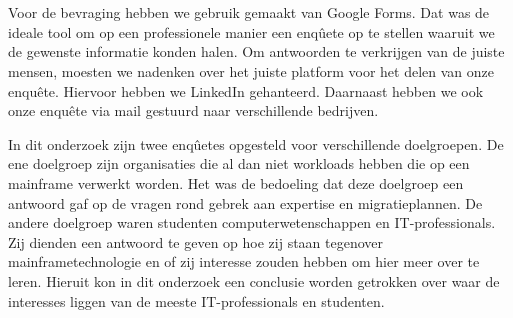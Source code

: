 \section{}
\label{sec:De bevraging}

Voor de bevraging hebben we gebruik gemaakt van Google Forms. Dat was de ideale tool om op een professionele manier een enqûete op te stellen waaruit we de gewenste informatie konden halen. Om antwoorden te verkrijgen van de juiste mensen, moesten we nadenken over het juiste platform voor het delen van onze enquête. Hiervoor hebben we LinkedIn gehanteerd. Daarnaast hebben we ook onze enquête via mail gestuurd naar verschillende bedrijven. 

In dit onderzoek zijn twee enqûetes opgesteld voor verschillende doelgroepen. De ene doelgroep zijn organisaties die al dan niet workloads hebben die op een mainframe verwerkt worden. Het was de bedoeling dat deze doelgroep een antwoord gaf op de vragen rond gebrek aan expertise en migratieplannen. De andere doelgroep waren studenten computerwetenschappen en IT-professionals. Zij dienden een antwoord te geven op hoe zij staan tegenover mainframetechnologie en of zij interesse zouden hebben om hier meer over te leren. Hieruit kon in dit onderzoek een conclusie worden getrokken over waar de interesses liggen van de meeste IT-professionals en studenten.

